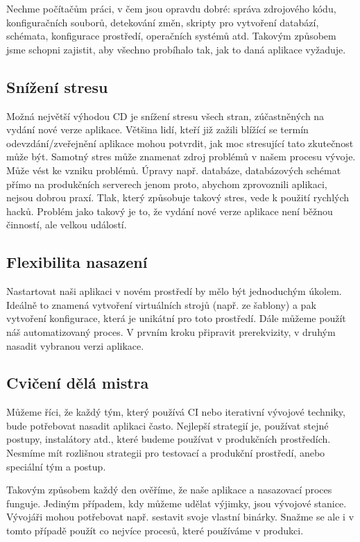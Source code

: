 Nechme počítačům práci, v čem jsou opravdu dobré: správa zdrojového kódu, konfiguračních souborů, detekování změn, skripty pro vytvoření databází, schémata, konfigurace prostředí, operačních systémů atd. Takovým způsobem jsme schopni zajistit, aby všechno probíhalo tak, jak to daná aplikace vyžaduje.

\subsection{Snížení stresu}
Možná největší výhodou CD je snížení stresu všech stran, zúčastněných na vydání nové verze aplikace. Většina lidí, kteří již zažili blížící se termín odevzdání/zveřejnění aplikace mohou potvrdit, jak moc stresující tato zkutečnost může být. Samotný stres může znamenat zdroj problémů v našem procesu vývoje. Může vést ke vzniku problémů. Úpravy např. databáze, databázových schémat přímo na produkčních serverech jenom proto, abychom zprovoznili aplikaci, nejsou dobrou praxí. 
Tlak, který způsobuje takový stres, vede k použití rychlých hacků. Problém jako takový je to, že vydání nové verze aplikace není běžnou činností, ale velkou událostí.

\subsection{Flexibilita nasazení}
Nastartovat naši aplikaci v novém prostředí by mělo být jednoduchým úkolem. Ideálně to znamená vytvoření virtuálních strojů (např. ze šablony) a pak vytvoření konfigurace, která je unikátní pro toto prostředí. Dále můžeme použít náš automatizovaný proces. V prvním kroku připravit prerekvizity, v druhým nasadit vybranou verzi aplikace.

\subsection{Cvičení dělá mistra}
Můžeme říci, že každý tým, který používá CI nebo iterativní vývojové techniky, bude potřebovat nasadit aplikaci často. Nejlepší strategií je, používat stejné postupy, instalátory atd., které budeme používat v produkčních prostředích. Nesmíme mít rozlišnou strategii pro testovací a produkční prostředí, anebo speciální tým a postup. 

Takovým způsobem každý den ověříme, že naše aplikace a nasazovací proces funguje. Jediným případem, kdy můžeme udělat výjimky, jsou vývojové stanice. Vývojáři mohou potřebovat např. sestavit svoje vlastní binárky. Snažme se ale i v tomto případě použít co nejvíce procesů, které používáme v produkci.

